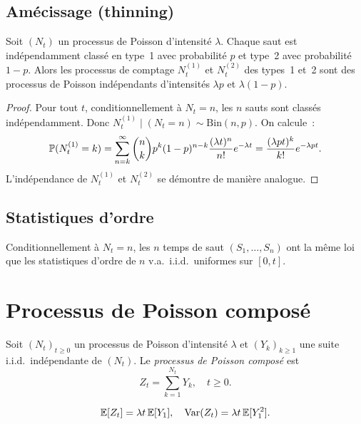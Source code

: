 \subsection{Am\'ecissage (thinning)}

\begin{theoreme}[Am\'ecissage]
\label{thm:thinning}
Soit $(N_t)$ un processus de Poisson d'intensit\'e $\lambda$. Chaque saut est
ind\'ependamment class\'e en type~1 avec probabilit\'e $p$ et type~2 avec
probabilit\'e $1-p$. Alors les processus de comptage $N_t^{(1)}$ et $N_t^{(2)}$
des types~1 et~2 sont des processus de Poisson ind\'ependants d'intensit\'es
$\lambda p$ et $\lambda(1-p)$.
\end{theoreme}

\begin{proof}
Pour tout $t$, conditionnellement \`a $N_t = n$, les $n$ sauts sont class\'es
ind\'ependamment. Donc $N_t^{(1)} \mid (N_t = n) \sim \text{Bin}(n, p)$.
On calcule~:
\[
  \mathbb{P}(N_t^{(1)} = k) = \sum_{n=k}^{\infty} \binom{n}{k} p^k (1-p)^{n-k}
  \frac{(\lambda t)^n}{n!} e^{-\lambda t} = \frac{(\lambda pt)^k}{k!} e^{-\lambda pt}.
\]
L'ind\'ependance de $N_t^{(1)}$ et $N_t^{(2)}$ se d\'emontre de mani\`ere analogue.
\end{proof}

\subsection{Statistiques d'ordre}

\begin{theoreme}
\label{thm:ordre}
Conditionnellement \`a $N_t = n$, les $n$ temps de saut $(S_1, \ldots, S_n)$
ont la m\^eme loi que les statistiques d'ordre de $n$ v.a.\ i.i.d.\ uniformes
sur $[0, t]$.
\end{theoreme}

\section{Processus de Poisson compos\'e}

\begin{definition}
Soit $(N_t)_{t \geq 0}$ un processus de Poisson d'intensit\'e $\lambda$ et
$(Y_k)_{k \geq 1}$ une suite i.i.d.\ ind\'ependante de $(N_t)$. Le
\emph{processus de Poisson compos\'e} est
\[
  Z_t = \sum_{k=1}^{N_t} Y_k, \quad t \geq 0.
\]
\end{definition}

\begin{proposition}
\[
  \mathbb{E}[Z_t] = \lambda t \, \mathbb{E}[Y_1], \quad \mathrm{Var}(Z_t) = \lambda t \, \mathbb{E}[Y_1^2].
\]
\end{proposition}

